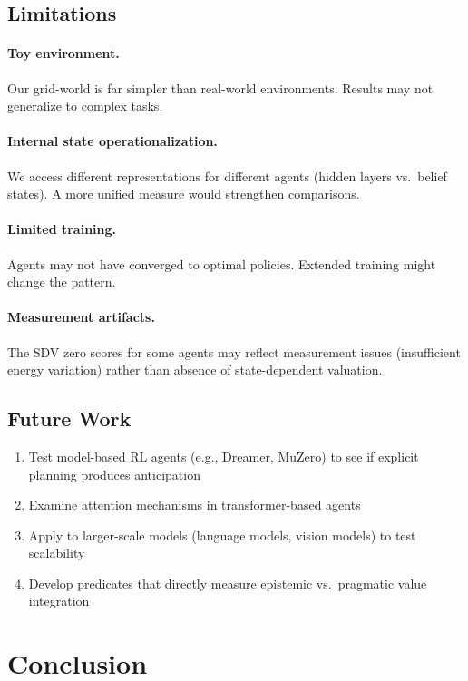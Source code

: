 \documentclass{article}
\begin{document}
\subsection{Limitations}

\paragraph{Toy environment.} Our grid-world is far simpler than real-world environments. Results may not generalize to complex tasks.

\paragraph{Internal state operationalization.} We access different representations for different agents (hidden layers vs.\ belief states). A more unified measure would strengthen comparisons.

\paragraph{Limited training.} Agents may not have converged to optimal policies. Extended training might change the pattern.

\paragraph{Measurement artifacts.} The SDV zero scores for some agents may reflect measurement issues (insufficient energy variation) rather than absence of state-dependent valuation.

\subsection{Future Work}

\begin{enumerate}
    \item Test model-based RL agents (e.g., Dreamer, MuZero) to see if explicit planning produces anticipation
    \item Examine attention mechanisms in transformer-based agents
    \item Apply to larger-scale models (language models, vision models) to test scalability
    \item Develop predicates that directly measure epistemic vs.\ pragmatic value integration
\end{enumerate}

\section{Conclusion}
\end{document}
